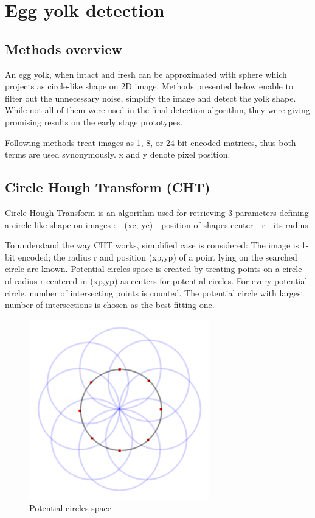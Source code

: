 \documentclass[12pt,twoside,a4paper]{article}
\begin{document}
\section{Egg yolk detection}
\subsection{Methods overview}
An egg yolk, when intact and fresh can be approximated with sphere which projects as circle-like shape on 2D image.
Methods presented below enable to filter out the unnecessary noise, simplify the image and detect the yolk shape.
While not all of them were used in the final detection algorithm, they were giving promising results on the early stage prototypes.

Following methods treat images as 1, 8, or 24-bit encoded matrices, thus both terms are used synonymously. 
x and y denote pixel position.

\subsection{Circle Hough Transform (CHT)}
Circle Hough Transform is an algorithm used for retrieving 3 parameters defining a circle-like shape on images\cite{hgtcv} : 
- (xc, yc) - position of shapes center
- r - its radius

To understand the way CHT works, simplified case is considered:
The image is 1-bit encoded; the radius r and position (xp,yp) of a point lying on the searched circle are known.
Potential circles space is created by treating points on a circle of radius r centered in (xp,yp) as centers for potential circles.
For every potential circle, number of intersecting points is counted.
The potential circle with largest number of intersections is chosen as the best fitting one.

 
\begin{figure}[H]
\centering
\includegraphics[width=0.4\paperwidth]{space}
\caption{Potential circles space\cite{craters}}
\end{figure}
\end{document}
